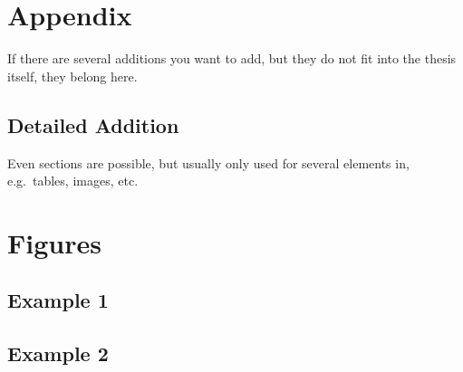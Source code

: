 \chapter{Appendix}

If there are several additions you want to add, but they do not fit into the thesis itself, they belong here.

\section{Detailed Addition}

Even sections are possible, but usually only used for several elements in, e.g.\ tables, images, etc.

\chapter{Figures}
\section{Example 1}
\cmark
\section{Example 2}
\xmark